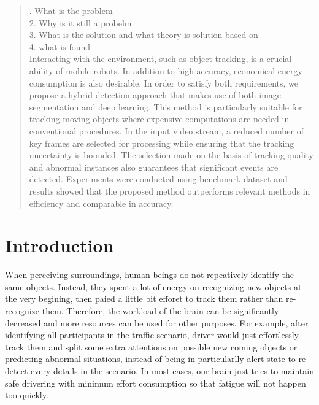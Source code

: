 \documentclass[12pt]{article}
\begin{document}
\maketitle

\begin{abstract}
. What is the problem\\
2. Why is it still a probelm\\
3. What is the solution and what theory is solution based on\\
4. what is found\\

Interacting with the environment, such as object tracking, is a crucial ability of mobile robots. In addition to high accuracy, economical energy consumption is also desirable. In order to satisfy both requirements, we propose a hybrid detection approach that makes use of both image segmentation and deep learning. This method is particularly suitable for tracking moving objects where expensive computations are needed in conventional procedures. In the input video stream, a reduced number of  key frames are selected for processing while ensuring that the tracking uncertainty is bounded. The selection made on the basis of tracking quality and abnormal instances also guarantees that significant events are detected. Experiments were conducted using benchmark dataset and results showed that the proposed method outperforms relevant methods in efficiency and comparable in accuracy.

\end{abstract}

\section{Introduction}\label{introduction}
\indent When perceiving surroundings, human beings do not repeatively identify the same objects. Instead, they spent a lot of energy on recognizing new objects at the very begining, then paied a little bit efforet to track them rather than re-recognize them. Therefore, the workload of the brain can be significantly decreased and more resources can be used for other purposes. For example, after identifying all participants in the traffic scenario, driver would just  effortlessly track them and split some extra attentions on possible new coming objects or predicting abnormal situations, instead of being in particularlly alert state to re-detect every details in the scenario. In most cases, our brain just tries to maintain safe drivering with minimum effort consumption so that fatigue will not happen too quickly.
\end{document}
